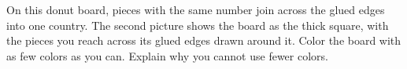 \documentclass[12pt]{extarticle}
\begin{document}
\vspace{0.6cm}
\centerline{}

\vspace{1cm}
\centerline{}

\newpage
{}On this donut board, pieces with the same number join across the glued edges into one country. The second picture shows the board as the thick square, with the pieces you reach across its glued edges drawn around it. Color the board with as few colors as you can. Explain why you cannot use fewer colors.

\vspace{0.5cm}
\noindent\begin{minipage}[c]{0.5\linewidth}\centering{}\end{minipage}\hfill
\begin{minipage}[c]{0.48\linewidth}\centering{}\end{minipage}
\end{document}
